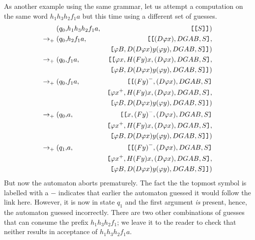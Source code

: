 \begin{example}As another example using the same grammar, let us
attempt a computation on the same word $h_1h_3h_2f_1a$ but this time
using a different set of guesses.
\begin{eqnarray}
\nonumber (q_0, & h_1h_3h_2f_1a, & \hbox{\tt [}{\hbox{\tt [}{S}\hbox{\tt ]}}\hbox{\tt ]})\\
\nonumber \rightarrow_+ (q_0, & h_2f_1a, & \hbox{\tt [}\hbox{\tt [}{{(D \varphi x)}, DGAB, S}\hbox{\tt ]},\\
\nonumber & & \hbox{\tt [}{{\varphi B}, D (D \varphi x) y (\varphi
y), DGAB,S}\hbox{\tt ]}\hbox{\tt ]})\\
\nonumber \rightarrow_+ (q_0, & f_1a, & \hbox{\tt [}\hbox{\tt [}{\varphi x,H (F y) x,{(D
\varphi x)}, DGAB, S}\hbox{\tt ]}, \\
\nonumber & &\hbox{\tt [}{{\varphi B}, D (D \varphi x) y (\varphi
y), DGAB,S}\hbox{\tt ]}\hbox{\tt ]})\\
\nonumber \rightarrow_+ (q_0, & f_1a, & \hbox{\tt [}\hbox{\tt [}{{(F y)}^{-},{(D\varphi x)}, DGAB, S}\hbox{\tt ]}\\
\nonumber & & \hbox{\tt [}{{\varphi x}^{+},H (F y) x,{(D\varphi x)}, DGAB, S}\hbox{\tt ]}, \\
\nonumber & & \hbox{\tt [}{{\varphi B}, D (D \varphi x) y (\varphi y),
DGAB,S}\hbox{\tt ]}\hbox{\tt ]})\\
\nonumber \rightarrow_+ (q_0, & a, & \hbox{\tt [}\hbox{\tt [}{x,{(F y)}^{-},{(D\varphi x)}, DGAB, S}\hbox{\tt ]}\\
\nonumber & & \hbox{\tt [}{{\varphi x}^{+},H (F y) x,{(D\varphi x)}, DGAB, S}\hbox{\tt ]}, \\
\nonumber & & \hbox{\tt [}{{\varphi B}, D (D \varphi x) y (\varphi y),
DGAB,S}\hbox{\tt ]}\hbox{\tt ]})\\
\nonumber \rightarrow_+ (q_1, & a, & \hbox{\tt [}\hbox{\tt [}{{(F y)}^{-},{(D\varphi x)}, DGAB, S}\hbox{\tt ]}\\
\nonumber & & \hbox{\tt [}{{\varphi x}^{+},H (F y) x,{(D\varphi x)}, DGAB, S}\hbox{\tt ]}, \\
\nonumber & & \hbox{\tt [}{{\varphi B}, D (D \varphi x) y (\varphi y),
DGAB,S}\hbox{\tt ]}\hbox{\tt ]})
\end{eqnarray}
But now the automaton aborts prematurely. The fact the the topmost
symbol is labelled with a $-$ indicates that earlier the automaton
guessed it would follow the link here. However, it is now in state
$q_1$ and the first argument \emph{is} present, hence, the
automaton guessed incorrectly. There are two other combinations of
guesses that can consume the prefix $h_1h_3h_2f_1$; we leave it to
the reader to check that neither results in acceptance of
$h_1h_3h_2f_1a$.
\end{example}

